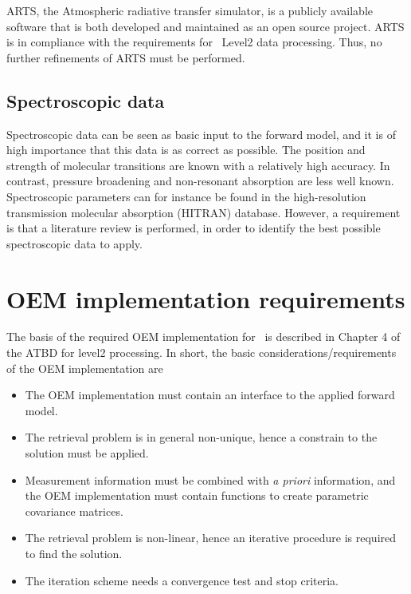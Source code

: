 ARTS, the Atmospheric radiative transfer simulator, 
is a publicly available software that is both developed and 
maintained as an open source project.
ARTS is in compliance with the requirements for \smr\ Level2
data processing. Thus, no further refinements of ARTS must be performed.

\subsection{Spectroscopic data}

Spectroscopic data can be seen as basic input to the forward model,  
and it is of high importance that this data is as correct as possible. 
The position and strength of molecular transitions 
are known with a relatively high accuracy. In contrast, pressure 
broadening and non-resonant absorption are less well known.
Spectroscopic parameters can for instance be found in the 
high-resolution transmission molecular absorption (HITRAN) database.
However, a requirement is that a literature review is performed,
in order to identify the best possible spectroscopic data to apply. 


\section{OEM implementation requirements}



The basis of the required OEM implementation for \smr\ 
is described in Chapter 4 of the ATBD for level2 processing.
In short, the basic considerations/requirements of the OEM implementation are
\begin{itemize}
\item The OEM implementation must contain an interface to 
      the applied forward model.
\item The retrieval problem is in general non-unique, hence
      a constrain to the solution must be applied.  
\item Measurement information must be combined with \textit{a priori}
      information, and the OEM implementation must contain functions to 
      create parametric covariance matrices.
\item The retrieval problem is non-linear, hence an iterative
      procedure is required to find the solution.
\item The iteration scheme needs a convergence test and stop 
      criteria.

\end{itemize}

